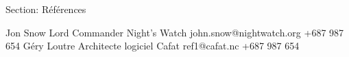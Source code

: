 Section: Références

\begin{referees}
		{Jon Snow}
		{Lord Commander}
		{Night's Watch}
		{john.snow@nightwatch.org}
		{+687 987 654}
		{Géry Loutre}
		{Architecte logiciel}
		{Cafat}
		{ref1@cafat.nc}
		{+687 987 654}
\end{referees}


